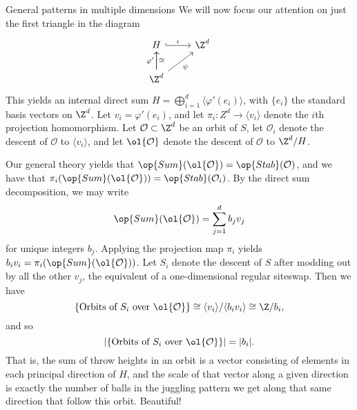 \documentclass[12nt]{article}
\theoremstyle{plain}
\begin{document}
\begin{subsection}{General patterns in multiple dimensions}
We will now focus our attention on just the first triangle in the diagram
\[
\begin{tikzcd}
H  \ar[r, hookrightarrow, "\iota"] & \Z^d \\
\Z^d \ar[u, "\varphi'"] \ar[u, "\cong"'] \ar[ur, "\psi"']
\end{tikzcd}
\]
This yields an internal direct sum $H = \bigoplus \limits_{i=1}^d \langle \varphi'(e_i) \rangle$, with $\{e_i\}$ the standard basis vectors on $\Z^d$. Let $v_i = \varphi'(e_i)$, and let $\pi_i : Z^d \to \langle v_i \rangle$ denote the $i$th projection homomorphism. Let $\mathcal{O} \subset \Z^d$ be an orbit of $S$, let $\mathcal{O}_i$ denote the descent of $\mathcal{O}$ to $\langle v_i \rangle$, and let $\ol{\mathcal{O}}$ denote the descent of $\mathcal{O}$ to $\Z^d/H$. 

Our general theory yields that $\op{Sum}(\ol{\mathcal{O}}) = \op{Stab}(\mathcal{O})$, and we have that $\pi_i(\op{Sum}(\ol{\mathcal{O}})) = \op{Stab}(\mathcal{O}_i)$. By the direct sum decomposition, we may write 
\[
\op{Sum}(\ol{\mathcal{O}}) = \sum \limits_{j=1}^d b_j v_j 
\]
for unique integers $b_j$. Applying the projection map $\pi_i$ yields $b_i v_i = \pi_i(\op{Sum}(\ol{\mathcal{O}}))$. Let $S_i$ denote the descent of $S$ after modding out by all the other $v_j$, the equivalent of a one-dimensional regular siteswap. Then we have 
\[
\{\text{Orbits of } S_i \text{ over } \ol{\mathcal{O}} \} \cong \langle v_i \rangle/ \langle b_i v_i \rangle \cong \Z/b_i,
\]
and so
\[
|\{\text{Orbits of } S_i \text{ over } \ol{\mathcal{O}} \}| = |b_i|.
\]
That is, the sum of throw heights in an orbit is a vector consisting of elements in each principal direction of $H$, and the scale of that vector along a given direction is exactly the number of balls in the juggling pattern we get along that same direction that follow this orbit. Beautiful!
\end{subsection}
%
\end{document}
